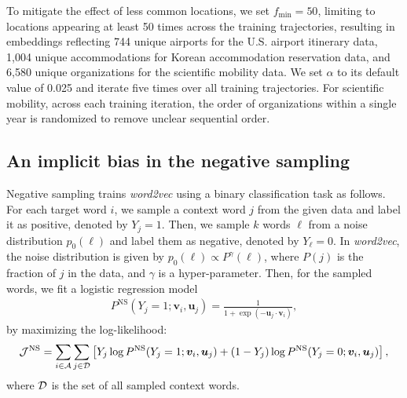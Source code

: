\documentclass[12pt]{article} %
\newcommand{\vect}[1]{\boldsymbol{#1}}
\begin{document}
To mitigate the effect of less common locations, we set $f_{\min} = 50$, limiting to locations appearing at least 50 times across the training trajectories, resulting in embeddings reflecting 744 unique airports for the U.S. airport itinerary data, 1,004 unique accommodations for Korean accommodation reservation data, and 6,580 unique organizations for the scientific mobility data.
We set $\alpha$ to its default value of 0.025 and iterate five times over all training trajectories.
For scientific mobility, across each training iteration, the order of organizations within a single year is randomized to remove unclear sequential order.


\subsection*{An implicit bias in the negative sampling}
\label{sec:sg_and_word2vec}

Negative sampling trains {\it word2vec} using a binary classification task as follows.
For each target word $i$, we sample a context word $j$ from the given data and label it as positive, denoted by $Y_{j}=1$.
Then, we sample $k$ words $\ell$ from a noise distribution $p_0(\ell)$ and label them as negative, denoted by $Y_{\ell}=0$.
In \textit{word2vec}, the noise distribution is given by $p_0(\ell) \propto P^\gamma (\ell)$, where $P(j)$ is the fraction of $j$ in the data, and $\gamma$ is a hyper-parameter.
Then, for the sampled words, we fit a logistic regression model
\begin{align}
	\label{eq:logistic-regress}
	P^{\text{NS}}(Y_{j} = 1; \vect{v}_{i}, \vect{u}_j) = \frac{1}{1 + \exp(-\vect{u}_j \cdot \vect{v}_{i})},
\end{align}
by maximizing the log-likelihood:
\begin{align}
	\label{eq:log-likelihood-logistic-regress}
	{\cal J}^{\text{NS}} = \sum_{i \in {\cal A}} \sum_{j \in {\cal D}} \left[ Y_{j} \log P^{\text{NS}}(Y_{j} = 1; \vect{v}_{i}, \vect{u}_j) + (1-Y_{j}) \log P^{\text{NS}}(Y_{j} = 0; \vect{v}_{i}, \vect{u}_j)\right],
\end{align}
where ${\cal D}$ is the set of all sampled context words.
\end{document}
